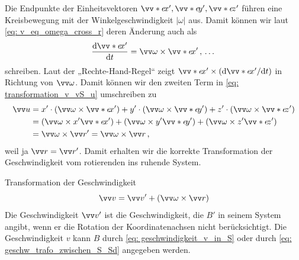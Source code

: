 Die Endpunkte der Einheitsvektoren $\ivecS{e}{x}', \ivecS{e}{y}', \ivecS{e}{z}'$ führen eine Kreisbewegung mit der Winkelgeschwindigkeit $|\omega|$ aus. Damit können wir laut \cref{eq: v_eq_omega_cross_r} deren Änderung auch als
\begin{equation}\label{eq: ableitung_einheitsvektor_dash}
    \frac{\dd \ivecS{e}{x}'}{\dd t} = \ivec{\omega} \times \ivecS{e}{x}'\mComma \dots
\end{equation}
schreiben. Laut der „Rechte-Hand-Regel“ zeigt $\ivecS{e}{x}' \times \left(\dd \ivecS{e}{x}'/\dd t\right)$ in Richtung von $\ivec{\omega}$. Damit können wir den zweiten Term in \cref{eq: transformation_v_vS_u} umschreiben zu 
\begin{equation}\begin{aligned}
    \ivec{u} &= x' \cdot \left( \ivec{\omega} \times \ivecS{e}{x}'\right) + y' \cdot \left( \ivec{\omega} \times \ivecS{e}{y}'\right) + z' \cdot \left( \ivec{\omega} \times \ivecS{e}{z}'\right) \\
    &= \left( \ivec{\omega} \times x'\ivecS{e}{x}'\right) + \left( \ivec{\omega} \times y'\ivecS{e}{y}'\right) + \left( \ivec{\omega} \times z'\ivecS{e}{z}'\right) \\
    &= \ivec{\omega} \times \ivec{r}' = \ivec{\omega} \times \ivec{r} \mComma
\end{aligned}\end{equation}
weil ja $\ivec{r} = \ivec{r}'$. Damit erhalten wir die korrekte Transformation der Geschwindigkeit vom rotierenden ins ruhende System. 

\begin{rememberbox}[]{Transformation der Geschwindigkeit}
    \begin{equation}\label{eq: geschw_trafo_zwischen_S_Sd}
        \ivec{v} = \ivec{v}' + (\ivec{\omega} \times \ivec{r})
    \end{equation}
    Die Geschwindigkeit $\ivec{v}'$ ist die Geschwindigkeit, die $B'$ in seinem System angibt, wenn er die Rotation der Koordinatenachsen nicht berücksichtigt. Die Geschwindigkeit $v$ kann $B$ durch \cref{eq: geschwindigkeit_v_in_S} oder durch \cref{eq: geschw_trafo_zwischen_S_Sd} angegeben werden.
\end{rememberbox}


